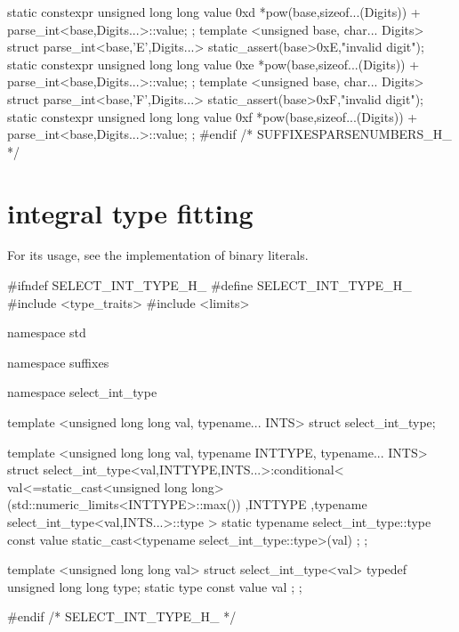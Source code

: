 \documentclass[ebook,11pt,article]{memoir}
\begin{document}
\begin{codeblock}
{{{{    static constexpr unsigned long long value{ 0xd *pow(base,sizeof...(Digits))
                                               + parse_int<base,Digits...>::value};
};
template <unsigned base, char... Digits>
struct parse_int<base,'E',Digits...>{
    static_assert(base>0xE,"invalid digit");
    static constexpr unsigned long long value{ 0xe *pow(base,sizeof...(Digits))
                                               + parse_int<base,Digits...>::value};
};
template <unsigned base, char... Digits>
struct parse_int<base,'F',Digits...>{
    static_assert(base>0xF,"invalid digit");
    static constexpr unsigned long long value{ 0xf *pow(base,sizeof...(Digits))
                                               + parse_int<base,Digits...>::value};
};
}
}
}
#endif /* SUFFIXESPARSENUMBERS_H_ */
\end{codeblock}

\section{integral type fitting}
For its usage, see the implementation of binary literals.
\begin{codeblock}
#ifndef SELECT_INT_TYPE_H_
#define SELECT_INT_TYPE_H_
#include <type_traits>
#include <limits>

namespace std {
namespace suffixes {
namespace select_int_type {

template <unsigned long long val, typename... INTS>
struct select_int_type;

template <unsigned long long val, typename INTTYPE, typename... INTS>
struct select_int_type<val,INTTYPE,INTS...>:conditional<
    val<=static_cast<unsigned long long>(std::numeric_limits<INTTYPE>::max())
    ,INTTYPE
    ,typename select_int_type<val,INTS...>::type >{
    static typename select_int_type::type const
        value{ static_cast<typename select_int_type::type>(val) };
};

template <unsigned long long val>
struct select_int_type<val>{
    typedef unsigned long long type;
    static type const value{  val };
};

}}}
#endif /* SELECT_INT_TYPE_H_ */
\end{codeblock}
\end{document}
